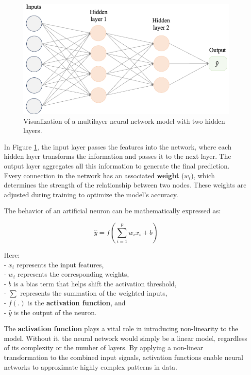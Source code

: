 \documentclass[
]{book}
\theoremstyle{definition}
\theoremstyle{definition}
\theoremstyle{definition}
\theoremstyle{definition}
\theoremstyle{remark}
\begin{document}
\begin{figure}

{\centering \includegraphics[width=0.8\linewidth]{images/net_large} 

}

\caption{Visualization of a multilayer neural network model with two hidden layers.}\label{fig:net-large}
\end{figure}

In Figure \ref{fig:net-large}, the input layer passes the features into the network, where each hidden layer transforms the information and passes it to the next layer. The output layer aggregates all this information to generate the final prediction. Every connection in the network has an associated \textbf{weight} (\(w_i\)), which determines the strength of the relationship between two nodes. These weights are adjusted during training to optimize the model's accuracy.

The behavior of an artificial neuron can be mathematically expressed as:

\[
\hat{y} = f\left( \sum_{i=1}^{p} w_i x_i + b \right)
\]

Here:\\
- \(x_i\) represents the input features,\\
- \(w_i\) represents the corresponding weights,\\
- \(b\) is a bias term that helps shift the activation threshold,\\
- \(\sum\) represents the summation of the weighted inputs,\\
- \(f(.)\) is the \textbf{activation function}, and\\
- \(\hat{y}\) is the output of the neuron.

The \textbf{activation function} plays a vital role in introducing non-linearity to the model. Without it, the neural network would simply be a linear model, regardless of its complexity or the number of layers. By applying a non-linear transformation to the combined input signals, activation functions enable neural networks to approximate highly complex patterns in data.
\end{document}
